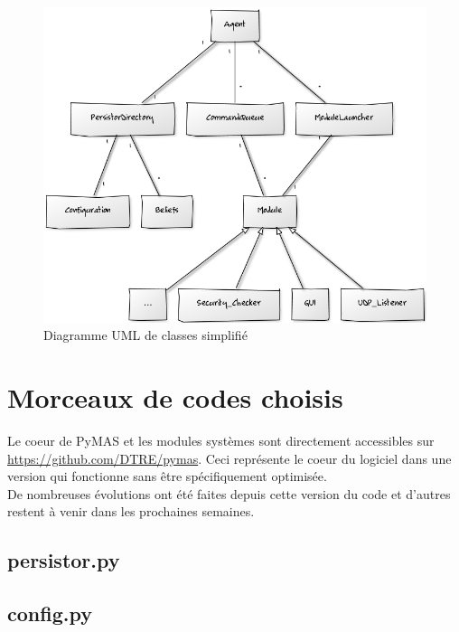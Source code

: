 \documentclass[11pt]{book}
\begin{document}
\begin{figure}[ht]
  \begin{center}
    \includegraphics[width=13cm]{imgs/pymas_uml.png}
    \caption{Diagramme UML de classes simplifié}
  \end{center}
\end{figure}

\clearpage

\section*{Morceaux de codes choisis}
Le coeur de PyMAS et les modules systèmes sont directement accessibles sur
\url{https://github.com/DTRE/pymas}. Ceci représente le coeur du logiciel 
dans une version qui fonctionne sans être spécifiquement optimisée.\\
De nombreuses évolutions ont été faites depuis cette version du code et 
d'autres restent à venir dans les prochaines semaines.

\subsection*{persistor.py}


\subsection*{config.py}

\end{document}
